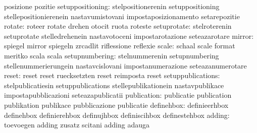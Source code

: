                                   posizione                        pozitie
                setuppositioning: stelpositionerenin               setuppositioning
                                  stellepositionierenein           nastavumistovani
                                  impostaposizionamento            setarepozitie
                          rotate: roteer                           rotate
                                  drehen                           otocit
                                  ruota                            roteste %
                     setuprotate: stelroterenin                    setuprotate
                                  stelledrehenein                  nastavotoceni
                                  impostarotazione                 seteazarotare
                          mirror: spiegel                          mirror
                                  spiegeln                         zrcadlit
                                  riflessione                      reflexie
                           scale: schaal                           scale
                                  format                           meritko
                                  scala                            scala %
                  setupnumbering: stelnummerenin                   setupnumbering
                                  stellenummerierungein            nastavcislovani
                                  impostanumerazione               seteazanumerotare
                           reset: reset                            reset
                                  ruecksetzten                     reset
                                  reimposta                        reset
               setuppublications: stelpublicatiesin                setuppublications
                                  stellepublikationein             nastavpublikace
                                  impostapubblicazioni             seteazapublicatii
                     publication: publicatie                       publication
                                  publikation                      publikace
                                  pubblicazione                    publicatie
                      definehbox: definieerhbox                    definehbox
                                  definierehbox                    definujhbox
                                  definiscihbox                    definestehbox
                          adding: toevoegen                        adding
                                  zusatz                           scitani
                                  adding                           adauga %
